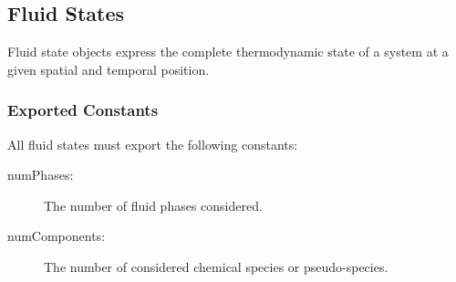 \subsection{Fluid States}
Fluid state objects express the complete thermodynamic state of a
system at a given spatial and temporal position.

\subsubsection{Exported Constants}
All fluid states must export the following constants:
\begin{description}
\item[numPhases:] The number of fluid phases considered.
\item[numComponents:] The number of considered chemical species or pseudo-species.
\end{description}

